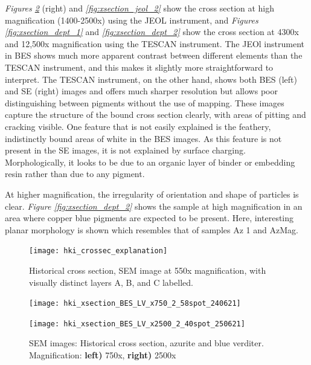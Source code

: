 \textit{Figures \ref{fig:xsection_jeol_1}} (right) and \textit{\ref{fig:xsection_jeol_2}} show the cross section at high magnification (1400-2500x) using the JEOL instrument, and \textit{Figures \ref{fig:xsection_dept_1}} and \textit{\ref{fig:xsection_dept_2}} show the cross section at 4300x and 12,500x magnification using the TESCAN instrument. The JEOl instrument in BES shows much more apparent contrast between different elements than the TESCAN instrument, and this makes it slightly more straightforward to interpret. The TESCAN instrument, on the other hand, shows both BES (left) and SE (right) images and offers much sharper resolution but allows poor distinguishing between pigments without the use of mapping. These images capture the structure of the bound cross section clearly, with areas of pitting and cracking visible. One feature that is not easily explained is the feathery, indistinctly bound areas of white in the BES images. As this feature is not present in the SE images, it is not explained by surface charging. Morphologically, it looks to be due to an organic layer of binder or embedding resin rather than due to any pigment.

At higher magnification, the irregularity of orientation and shape of particles is clear. \textit{Figure \ref{fig:xsection_dept_2}} shows the sample at high magnification in an area where copper blue pigments are expected to be present. Here, interesting planar morphology is shown which resembles that of samples Az 1 and AzMag.

\begin{figure}[H]
\centering
  \texttt{[image: hki\_crossec\_explanation]}
\caption[Historical cross section with visually distinct layers A, B, and C labelled]{Historical cross section, SEM image at 550x magnification, with visually distinct layers A, B, and C labelled.}
\label{fig:hki_crossec_explanation}
\end{figure}

\begin{figure}[H]
\centering
\begin{minipage}{.45\textwidth}
  \centering
  \texttt{[image: hki\_xsection\_BES\_LV\_x750\_2\_58spot\_240621]}     
\end{minipage}
\begin{minipage}{.45\textwidth}
  \centering
  \texttt{[image: hki\_xsection\_BES\_LV\_x2500\_2\_40spot\_250621]}    
\end{minipage}
\caption[SEM images: Historical cross section, azurite and blue verditer]{SEM images: Historical cross section, azurite and blue verditer. Magnification: \textbf{left)} 750x, \textbf{right)} 2500x}
\label{fig:xsection_jeol_1}
\end{figure}

